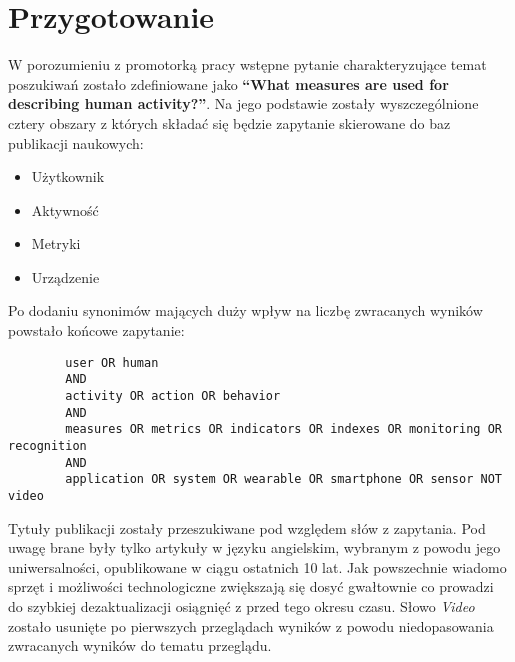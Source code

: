 \section{Przygotowanie}
W porozumieniu z promotorką pracy wstępne pytanie charakteryzujące temat poszukiwań zostało zdefiniowane jako \textbf{``What measures are used for describing human activity?''}. Na jego podstawie zostały wyszczególnione cztery obszary z których składać się będzie zapytanie skierowane do baz publikacji naukowych:
\begin{itemize}
    \item Użytkownik
    \item Aktywność
    \item Metryki
    \item Urządzenie
\end{itemize}

Po dodaniu synonimów mających duży wpływ na liczbę zwracanych wyników powstało końcowe zapytanie:
\begin{center}
	\begin{minipage}{0.9\linewidth}
		\begin{verbatim}
		user OR human
		AND
		activity OR action OR behavior
		AND
		measures OR metrics OR indicators OR indexes OR monitoring OR recognition
		AND
		application OR system OR wearable OR smartphone OR sensor NOT video
		\end{verbatim}
	\end{minipage}
\end{center}

Tytuły publikacji zostały przeszukiwane pod względem słów z zapytania. Pod uwagę brane były tylko artykuły w języku angielskim, wybranym z powodu jego uniwersalności, opublikowane w ciągu ostatnich 10 lat. Jak powszechnie wiadomo sprzęt i możliwości technologiczne zwiększają się dosyć gwałtownie co prowadzi do szybkiej dezaktualizacji osiągnięć z przed tego okresu czasu. Słowo \textit{Video} zostało usunięte po pierwszych przeglądach wyników z powodu niedopasowania zwracanych wyników do tematu przeglądu.
